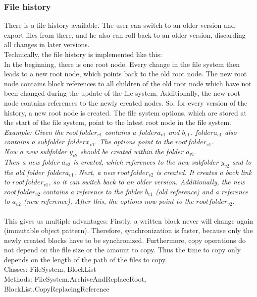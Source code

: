 \documentclass[JCDReport.tex]{subfiles}
\begin{document}
\subsubsection{File history}
There is a file history available. The user can switch to an older version and export files from there, and he also can roll back to an older version, discarding all changes in later versions.\\
Technically, the file history is implemented like this:\\
In the beginning, there is one root node. Every change in the file system then leads to a new root node, which points back to the old root node. The new root node contains block references to all children of the old root node which have not been changed during the update of the file system. Additionally, the new root node contains references to the newly created nodes. So, for every version of the history, a new root node is created. The file system options, which are stored at the start of the file system, point to the latest root node in the file system.\\
\emph{
Example: Given the $root folder_{v1}$ contains a $folder a_{v1}$ and $b_{v1}$. $folder a_{v1}$ also contains a subfolder $folder x_{v1}$. The options point to the $root folder_{v1}$.\\
Now a new subfolder $y_{v2}$ should be created within the folder $a_{v1}$.\\
Then a new folder $a_{v2}$ is created, which references to the new subfolder $y_{v2}$ and to the old folder $folder a_{v1}$. Next, a new $root folder_{v2}$ is created. It creates a back link to $root folder_{v1}$, so it can switch back to an older version. Additionally, the new $root folder_{v2}$ contains a reference to the folder $b_{v1}$ (old reference) and a reference to $a_{v2}$ (new reference). After this, the options now point to the $root folder_{v2}$.\\
}\\
This gives us multiple advantages: Firstly, a written block never will change again (immutable object pattern). Therefore, synchronization is faster, because only the newly created blocks have to be synchronized. Furthermore, copy operations do not depend on the file size or the amount to copy. Thus the time to copy only depends on the length of the path of the files to copy.\\
Classes: FileSystem, BlockList\\
Methods: FileSystem.ArchiveAndReplaceRoot, BlockList.CopyReplacingReference
\end{document}
